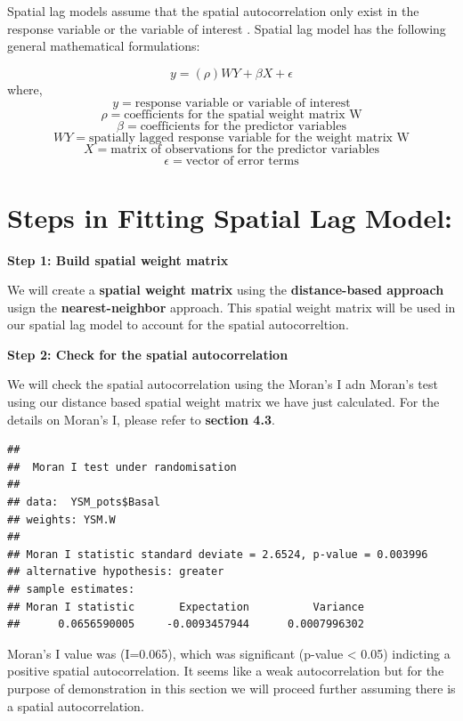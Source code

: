 \documentclass[
]{book}
\begin{document}
Spatial lag models assume that the spatial autocorrelation only exist in the response variable or the variable of interest \citep{Anselin1998}. Spatial lag model has the following general mathematical formulations:

\[ y=  (\rho)WY + \beta X + \epsilon\]
where, \[y= \text{response variable or variable of interest}\]
\[\rho= \text{coefficients for the spatial weight matrix W}\]
\[\beta= \text{coefficients for the predictor variables}\]
\[WY=\text{spatially lagged response variable for the weight matrix W}\]
\[X=\text{matrix of observations for the predictor variables}\]
\[\epsilon=\text{vector of error terms}\]

\hypertarget{steps-in-fitting-spatial-lag-model}{%
\section{Steps in Fitting Spatial Lag Model:}\label{steps-in-fitting-spatial-lag-model}}

\textbf{Step 1: Build spatial weight matrix}

We will create a \textbf{spatial weight matrix} using the \textbf{distance-based approach} usign the \textbf{nearest-neighbor} approach. This spatial weight matrix will be used in our spatial lag model to account for the spatial autocorreltion.

\textbf{Step 2: Check for the spatial autocorrelation}

We will check the spatial autocorrelation using the Moran's I adn Moran's test using our distance based spatial weight matrix \citep{Getis2010} we have just calculated. For the details on Moran's I, please refer to \textbf{section 4.3}.

\begin{verbatim}
## 
##  Moran I test under randomisation
## 
## data:  YSM_pots$Basal  
## weights: YSM.W    
## 
## Moran I statistic standard deviate = 2.6524, p-value = 0.003996
## alternative hypothesis: greater
## sample estimates:
## Moran I statistic       Expectation          Variance 
##      0.0656590005     -0.0093457944      0.0007996302
\end{verbatim}

Moran's I value was (I=0.065), which was significant (p-value \textless{} 0.05) indicting a positive spatial autocorrelation. It seems like a weak autocorrelation but for the purpose of demonstration in this section we will proceed further assuming there is a spatial autocorrelation.
\end{document}
